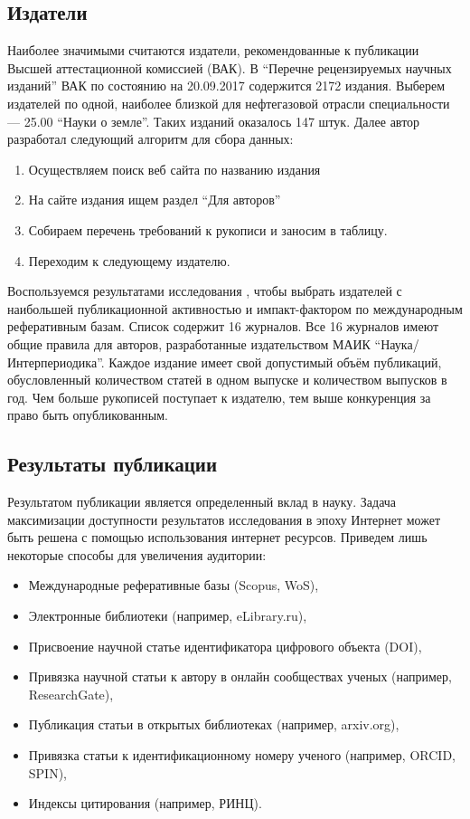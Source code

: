 \subsection{Издатели}
Наиболее значимыми считаются издатели, рекомендованные к публикации Высшей аттестационной комиссией (ВАК). В ``Перечне рецензируемых научных изданий'' ВАК по состоянию на 20.09.2017 содержится 2172 издания. 
Выберем издателей по одной, наиболее близкой для нефтегазовой отрасли специальности — 25.00 ``Науки о земле''. 
Таких изданий оказалось 147 штук. 
Далее автор разработал следующий алгоритм для сбора данных:

\begin{enumerate}
\tightlist
\item Осуществляем поиск веб сайта по названию издания
\item На сайте издания ищем раздел ``Для авторов''
\item Собираем перечень требований к рукописи и заносим в таблицу.
\item Переходим к следующему издателю.
\end{enumerate}

Воспользуемся результатами исследования \cite{mazov2015russian}, чтобы выбрать издателей с наибольшей публикационной активностью и импакт-фактором по международным реферативным базам. 
Список содержит 16 журналов. 
Все 16 журналов имеют общие правила для авторов, разработанные издательством МАИК ``Наука/Интерпериодика''.
Каждое издание имеет свой допустимый объём публикаций, обусловленный количеством статей в одном выпуске и количеством выпусков в год.
Чем больше рукописей поступает к издателю, тем выше конкуренция за право быть опубликованным.  

\subsection{Результаты публикации}
Результатом публикации является определенный вклад в науку. 
Задача максимизации доступности результатов исследования в эпоху Интернет может быть решена с помощью использования интернет ресурсов. 
Приведем лишь некоторые способы для увеличения аудитории: 

\begin{itemize}
\tightlist
\item Международные реферативные базы (Scopus, WoS), 
\item Электронные библиотеки (например, eLibrary.ru),
\item Присвоение научной статье идентификатора цифрового объекта (DOI), 
\item Привязка научной статьи к автору в онлайн сообществах ученых (например, ResearchGate),
\item Публикация статьи в открытых библиотеках (например, arxiv.org),
\item Привязка статьи к идентификационному номеру ученого (например, ORCID, SPIN),
\item Индексы цитирования (например, РИНЦ).
\end{itemize}

